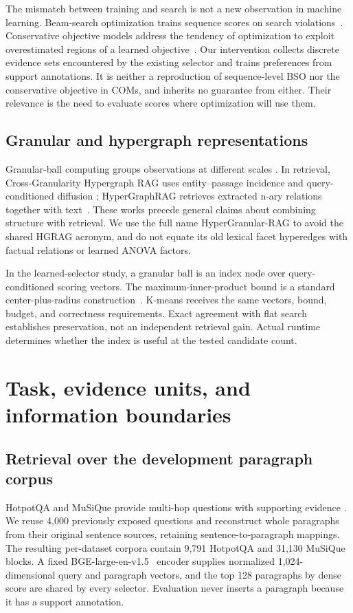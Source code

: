 \documentclass[pdflatex,sn-mathphys-num]{sn-jnl}
\begin{document}
The mismatch between training and search is not a new observation in
machine learning. Beam-search optimization trains sequence scores on
search violations~\cite{wiseman2016bso}. Conservative objective models address
the tendency of optimization to exploit overestimated regions of a learned
objective~\cite{trabucco2021com}. Our intervention collects discrete
evidence sets encountered by the existing selector and trains preferences
from support annotations. It is neither a reproduction of sequence-level
BSO nor the conservative objective in COMs, and inherits no guarantee from
either. Their relevance is the need to evaluate scores where optimization
will use them.

\subsection{Granular and hypergraph representations}
Granular-ball computing groups observations at different scales
\cite{xia2019granularball}. In retrieval, Cross-Granularity Hypergraph RAG
uses entity--passage incidence and query-conditioned diffusion
\cite{wang2026crossgranularity}; HyperGraphRAG retrieves extracted n-ary
relations together with text~\cite{luo2025hypergraphrag}. These works precede
general claims about combining structure with retrieval. We use the full
name HyperGranular-RAG to avoid the shared HGRAG acronym, and do not equate
its old lexical facet hyperedges with factual relations or learned ANOVA
factors.

In the learned-selector study, a granular ball is an index node over
query-conditioned scoring vectors. The maximum-inner-product bound is a
standard center-plus-radius construction~\cite{ram2012tree}. K-means receives
the same vectors, bound, budget, and correctness requirements. Exact
agreement with flat search establishes preservation, not an independent
retrieval gain. Actual runtime determines whether the index is useful at
the tested candidate count.

\section{Task, evidence units, and information boundaries}
\subsection{Retrieval over the development paragraph corpus}
HotpotQA and MuSiQue provide multi-hop questions with supporting evidence
\cite{yang2018hotpotqa,trivedi2022musique}. We reuse 4,000 previously exposed
questions and reconstruct whole paragraphs from their original sentence
sources, retaining sentence-to-paragraph mappings. The resulting per-dataset
corpora contain 9,791 HotpotQA and 31,130 MuSiQue blocks. A fixed BGE-large-en-v1.5~\cite{xiao2023bge}
encoder supplies normalized 1,024-dimensional query and paragraph vectors,
and the top 128 paragraphs by dense score are shared by every selector.
Evaluation never inserts a paragraph because it has a support annotation.
\end{document}
